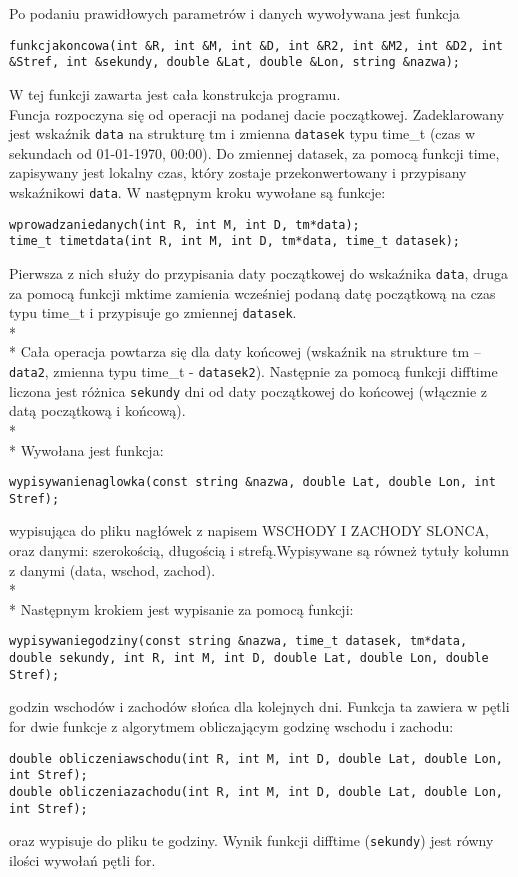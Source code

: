 \documentclass[12pt,a4paper]{article}
\begin{document}
Po podaniu prawidłowych parametrów i danych wywoływana jest funkcja 
\begin{lstlisting}
funkcjakoncowa(int &R, int &M, int &D, int &R2, int &M2, int &D2, int &Stref, int &sekundy, double &Lat, double &Lon, string &nazwa);
\end{lstlisting} 
W tej funkcji zawarta jest cała konstrukcja programu. \\
Funcja rozpoczyna się od operacji na podanej dacie początkowej. Zadeklarowany jest wskaźnik \lstinline!data! na strukturę tm i zmienna \lstinline!datasek! typu time\_t (czas w sekundach od 01-01-1970, 00:00). Do zmiennej datasek, za pomocą funkcji time, zapisywany jest lokalny czas, który zostaje przekonwertowany i przypisany wskaźnikowi \lstinline!data!. 
W następnym  kroku wywołane są funkcje:
\begin{lstlisting}
wprowadzaniedanych(int R, int M, int D, tm*data);
time_t timetdata(int R, int M, int D, tm*data, time_t datasek);
\end{lstlisting}
Pierwsza z nich służy do przypisania daty początkowej do wskaźnika \lstinline!data!, druga za pomocą funkcji mktime zamienia wcześniej podaną datę początkową na czas typu time\_t i przypisuje go zmiennej \lstinline!datasek!.
\\* 
\\* 
Cała operacja powtarza się dla daty końcowej (wskaźnik na strukture tm --  \lstinline!data2!, zmienna typu time\_t -  \lstinline!datasek2!).
Następnie za pomocą funkcji difftime liczona jest różnica \lstinline!sekundy! dni od daty początkowej do końcowej (włącznie z datą początkową i końcową). 
 \\* 
\\*
Wywołana jest funkcja:
\begin{lstlisting}
wypisywanienaglowka(const string &nazwa, double Lat, double Lon, int Stref);
\end{lstlisting}
wypisująca do pliku nagłówek z napisem WSCHODY I ZACHODY SLONCA, oraz danymi: szerokością, długością i strefą.Wypisywane są równeż tytuły kolumn z danymi (data, wschod, zachod).
 \\* 
\\*
Następnym krokiem jest wypisanie za pomocą funkcji:
\begin{lstlisting}
wypisywaniegodziny(const string &nazwa, time_t datasek, tm*data, double sekundy, int R, int M, int D, double Lat, double Lon, double Stref);
\end{lstlisting}
godzin wschodów i zachodów słońca dla kolejnych dni. Funkcja ta zawiera w pętli for dwie funkcje z algorytmem obliczającym godzinę wschodu i zachodu:
\begin{lstlisting}
double obliczeniawschodu(int R, int M, int D, double Lat, double Lon, int Stref);
double obliczeniazachodu(int R, int M, int D, double Lat, double Lon, int Stref);
\end{lstlisting}
oraz wypisuje do pliku te godziny.   
 Wynik funkcji difftime (\lstinline!sekundy!) jest równy ilości wywołań pętli for. 
\end{document}
